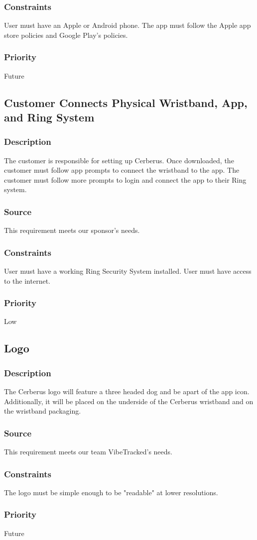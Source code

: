 \subsubsection{Constraints}
User must have an Apple or Android phone. The app must follow the Apple app store policies and Google Play's policies.
\subsubsection{Priority}
Future

\subsection{Customer Connects Physical Wristband, App, and Ring System}
\subsubsection{Description}
The customer is responsible for setting up Cerberus. Once downloaded, the customer must follow app prompts to connect the wristband to the app. The customer must follow more prompts to login and connect the app to their Ring system.
\subsubsection{Source}
This requirement meets our sponsor's needs.
\subsubsection{Constraints}
User must have a working Ring Security System installed. User must have access to the internet. 
\subsubsection{Priority}
Low

\subsection{Logo}
\subsubsection{Description}
The Cerberus logo will feature a three headed dog and be apart of the app icon. Additionally, it will be placed on the underside of the Cerberus wristband and on the wristband packaging.
\subsubsection{Source}
This requirement meets our team VibeTracked's needs.
\subsubsection{Constraints}
The logo must be simple enough to be "readable" at lower resolutions.
\subsubsection{Priority}
Future
